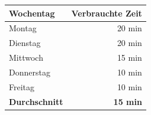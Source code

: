 \begin{tabular}{lr}
\rowcolor{heading}\textbf{Wochentag} & \textbf{Verbrauchte Zeit} \\
\hline
Montag & 20 min \\
\rowcolor{odd}Dienstag & 20 min \\
Mittwoch & 15 min \\
\rowcolor{odd}Donnerstag & 10 min \\
Freitag & 10 min \\
\hline
\rowcolor{odd}\textbf{Durchschnitt} & \textbf{15 min} \\
\end{tabular}
